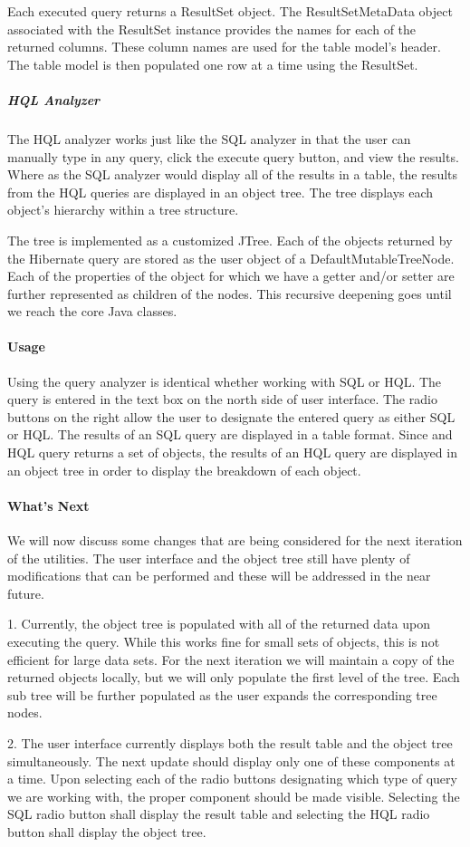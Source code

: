 Each executed query returns a ResultSet object. The ResultSetMetaData object associated with the ResultSet instance provides the names for each of the returned columns. These column names are used for the table model's header. The table model is then populated one row at a time using the ResultSet.

\subparagraph{HQL Analyzer}

The HQL analyzer works just like the SQL analyzer in that the user can manually type in any query, click the execute query button, and view the results. Where as the SQL analyzer would display all of the results in a table, the results from the HQL queries are displayed in an object tree. The tree displays each object's hierarchy within a tree structure.

The tree is implemented as a customized JTree. Each of the objects returned by the Hibernate query are stored as the user object of a DefaultMutableTreeNode. Each of the properties of the object for which we have a getter and/or setter are further represented as children of the nodes. This recursive deepening goes until we reach the core Java classes.

\paragraph{Usage}
Using the query analyzer is identical whether working with SQL or HQL. The query is entered in the text box on the north side of user interface. The radio buttons on the right allow the user to designate the entered query as either SQL or HQL. The results of an SQL query are displayed in a table format. Since and HQL query returns a set of objects, the results of an HQL query are displayed in an object tree in order to display the breakdown of each object.

\paragraph{What's Next}
We will now discuss some changes that are being considered for the next iteration of the utilities. The user interface and the object tree still have plenty of modifications that can be performed and these will be addressed in the near future.

1. Currently, the object tree is populated with all of the returned data upon executing the query. While this works fine for small sets of objects, this is not efficient for large data sets. For the next iteration we will maintain a copy of the returned objects locally, but we will only populate the first level of the tree. Each sub tree will be further populated as the user expands the corresponding tree nodes.

2. The user interface currently displays both the result table and the object tree simultaneously. The next update should display only one of these components at a time. Upon selecting each of the radio buttons designating which type of query we are working with, the proper component should be made visible. Selecting the SQL radio button shall display the result table and selecting the HQL radio button shall display the object tree.
